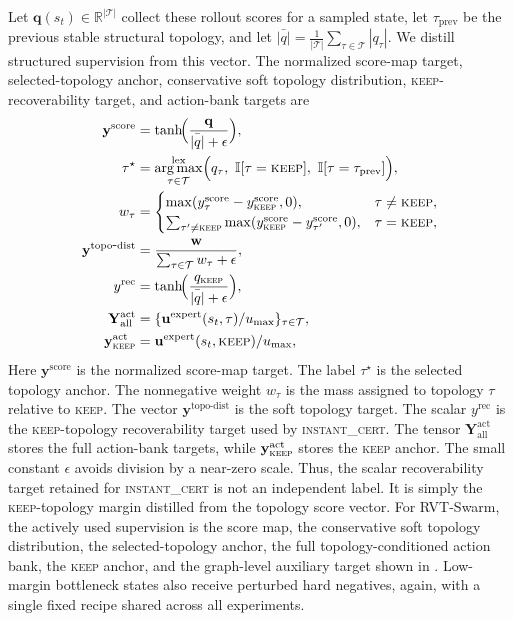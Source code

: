\documentclass{ieeeaccess}
\DeclareMathOperator*{\argmax}{arg\,max}
\newcommand{\R}{\mathbb{R}}
\newcommand{\cT}{\mathcal{T}}
\newcommand{\bfu}{\mathbf{u}}
\begin{document}
Let $\mathbf{q}(s_t)\in\R^{|\cT|}$ collect these rollout scores for a sampled state, let $\tau_{\mathrm{prev}}$ be the previous stable structural topology, and let $\bar{|q|}=\frac{1}{|\cT|}\sum_{\tau\in\cT}|q_\tau|$. We distill structured supervision from this vector. The normalized score-map target, selected-topology anchor, conservative soft topology distribution, \textsc{keep}-recoverability target, and action-bank targets are
\begingroup\footnotesize
\begin{equation}
\begin{aligned}
\mathbf{y}^{\mathrm{score}}
&= \tanh\!\Bigl(\frac{\mathbf{q}}{\bar{|q|}+\epsilon}\Bigr), \\
\tau^\star &= \argmax_{\tau\in\cT}^{\mathrm{lex}}
\Bigl(q_\tau,\ \mathbb{I}[\tau=\textsc{keep}],\ \mathbb{I}[\tau=\tau_{\mathrm{prev}}]\Bigr), \\
w_\tau &=
\begin{cases}
\max(y^{\mathrm{score}}_\tau - y^{\mathrm{score}}_{\textsc{keep}}, 0), & \tau \neq \textsc{keep},\\
\sum_{\tau' \neq \textsc{keep}} \max(y^{\mathrm{score}}_{\textsc{keep}} - y^{\mathrm{score}}_{\tau'}, 0), & \tau = \textsc{keep},
\end{cases} \\
\mathbf{y}^{\mathrm{topo\mbox{-}dist}}
&= \frac{\mathbf{w}}{\sum_{\tau\in\cT} w_\tau + \epsilon}, \\
y^{\mathrm{rec}}
&= \tanh\!\Bigl(\frac{q_{\textsc{keep}}}{\bar{|q|}+\epsilon}\Bigr), \\
\mathbf{Y}^{\mathrm{act}}_{\mathrm{all}}
&= \{\bfu^{\mathrm{expert}}(s_t,\tau)/u_{\max}\}_{\tau\in\cT}, \\
\mathbf{y}^{\mathrm{act}}_{\textsc{keep}}
&= \bfu^{\mathrm{expert}}(s_t,\textsc{keep}) / u_{\max},
\label{eq:targets}
\end{aligned}
\end{equation}
\endgroup
Here $\mathbf{y}^{\mathrm{score}}$ is the normalized score-map target.
The label $\tau^\star$ is the selected topology anchor.
The nonnegative weight $w_\tau$ is the mass assigned to topology $\tau$
relative to \textsc{keep}. The vector
$\mathbf{y}^{\mathrm{topo\mbox{-}dist}}$ is the soft topology target.
The scalar $y^{\mathrm{rec}}$ is the \textsc{keep}-topology
recoverability target used by \textsc{instant\_cert}. The tensor
$\mathbf{Y}^{\mathrm{act}}_{\mathrm{all}}$ stores the full action-bank
targets, while $\mathbf{y}^{\mathrm{act}}_{\textsc{keep}}$ stores the
\textsc{keep} anchor. The small constant $\epsilon$ avoids division by
a near-zero scale. Thus, the scalar recoverability target retained for
\textsc{instant\_cert} is not an independent label. It is simply the
\textsc{keep}-topology margin distilled from the topology score vector.
For RVT-Swarm, the actively used supervision is the score map, the
conservative soft topology distribution, the selected-topology anchor, the full topology-conditioned action bank, the \textsc{keep} anchor, and the graph-level auxiliary target shown in .
Low-margin bottleneck states also receive perturbed hard negatives,
again, with a single fixed recipe shared across all experiments.
\end{document}
